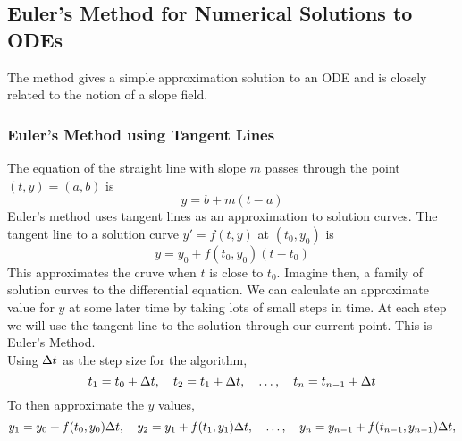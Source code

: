 \documentclass{report}
\begin{document}
\subsection*{Euler's Method for Numerical Solutions to ODEs}
The method gives a simple approximation solution to an ODE and is closely related to the notion of a slope field.

\subsubsection*{Euler's Method using Tangent Lines}
The equation of the straight line with slope $m$ passes through the point $(t,y)=(a,b)$ is
$$
	y = b + m(t-a)
$$
Euler's method uses tangent lines as an approximation to solution curves. The tangent line to a solution curve $y'=f(t,y)$ at $(t_0, y_0)$ is 
$$
	y = y_0 + f(t_0, y_0)(t-t_0)
$$
This approximates the cruve when $t$ is close to $t_0$. Imagine then, a family of solution curves to the differential equation. We can calculate an approximate value for $y$ at some later time by taking lots of small steps in time. At each step we will use the tangent line to the solution through our current point. This is Euler's Method. \\

Using $\Delta t$ as the step size for the algorithm,
$$
	t_1 = t_0 + \Delta t,\quad t_2 = t_1 + \Delta t,\quad \dots,\quad t_n = t_{n-1} + \Delta t
$$
To then approximate the $y$ values,
$$
	y_1 = y_0 + f(t_0, y_0)\Delta t,\quad y_2 = y_1 + f(t_1, y_1)\Delta t,\quad \dots,\quad y_n = y_{n-1} + f(t_{n-1}, y_{n-1})\Delta t,
$$

\end{document}
